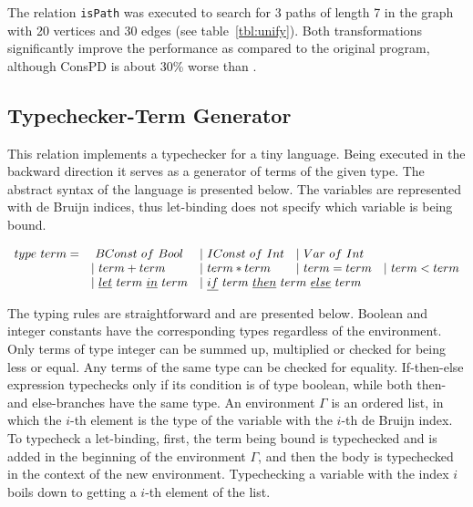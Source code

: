 The relation \lstinline{isPath} was executed to search for 3 paths of length 7 in the graph with 20 vertices and 30 edges (see table~\ref{tbl:unify}).
Both transformations significantly improve the performance as compared to the original program, although ConsPD is about 30\% worse than \ecce.


\subsection{Typechecker-Term Generator}

This relation implements a typechecker for a tiny language.
Being executed in the backward direction it serves as a generator of terms of the given type.
The abstract syntax of the language is presented below.
The variables are represented with de Bruijn indices, thus let-binding does not specify which variable is being bound.



\[\begin{array}{lllll}
  type \ term = &\ BConst \ of \ Bool &| \ IConst \ of \ Int &| \ Var \ of \ Int & \\
  & | \ term + term &| \ term * term &| \ term = term &| \ term < term \\
  &| \ \underline{let} \ term \ \underline{in} \ term
  &\multicolumn{2}{l}{| \ \underline{if} \ term \ \underline{then} \ term \ \underline{else} \ term} &
\end{array}\]

The typing rules are straightforward and are presented below.
Boolean and integer constants have the corresponding types regardless of the environment.
Only terms of type integer can be summed up, multiplied or checked for being less or equal.
Any terms of the same type can be checked for equality.
If-then-else expression typechecks only if its condition is of type boolean, while both then- and else-branches have the same type.
An environment $\Gamma$ is an ordered list, in which the $i$-th element is the type of the variable with the $i$-th de Bruijn index.
To typecheck a let-binding, first, the term being bound is typechecked and is added in the beginning of the environment $\Gamma$, and then the body is typechecked in the context of the new environment.
Typechecking a variable with the index $i$ boils down to getting a $i$-th element of the list.

